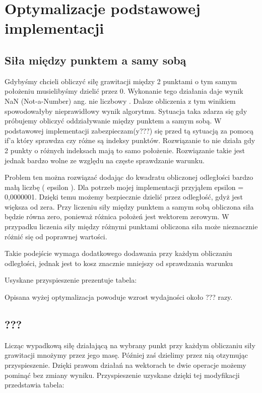 
\section { Optymalizacje podstawowej implementacji }

\subsection { Siła między punktem a samy sobą }
Gdybyśmy chcieli obliczyć siłę grawitacji między 2 punktami o tym samym położeniu musielibyśmy dzielić przez 0. Wykonanie tego działania daje wynik NaN (Not-a-Number) { ang. nie liczbowy }. Dalsze obliczenia z tym winikiem spowodowałyby nieprawidłowy wynik algorytmu. Sytuacja taka zdarza się gdy próbujemy obliczyć oddziaływanie między punktem a samym sobą. W podstawowej implementacji zabezpieczam(y???) się przed tą sytuacją za pomocą if'a który sprawdza czy różne są indeksy punktów. Rozwiązanie to nie działa gdy 2 punkty o różnych indeksach mają to samo położenie.
Rozwiązanie takie jest jednak bardzo wolne ze względu na częste sprawdzanie warunku. \linebreak

Problem ten można rozwiązać dodając do kwadratu obliczonej odległości bardzo małą liczbę ( epsilon ). Dla potrzeb mojej implementacji przyjąłem epsilon = 0,0000001. Dzięki temu możemy bezpiecznie dzielić przez odległość, gdyż jest większa od zera. Przy liczeniu siły między punktem a samym sobą obliczona siła będzie równa zero, ponieważ różnica położeń jest wektorem zerowym. W przypadku liczenia siły między różnymi punktami obliczona siła może nieznacznie różnić się od poprawnej wartości.

Takie podejście wymaga dodatkowego dodawania przy każdym obliczaniu odległości, jednak jest to kosz znacznie mniejszy od sprawdzania warunku

Usyskane przyspieszenie prezentuje tabela:
\linebreak

Opisana wyżej optymalizacja powoduje wzrost wydajności około ??? razy. 


\subsection { ??? }
Licząc wypadkową siłę działającą na wybrany punkt przy każdym obliczaniu siły grawitacji mnożymy przez jego masę. Później zaś dzielimy przez nią otzymując przyspieszenie. Dzięki prawom działań na wektorach te dwie operacje możemy pominąć bez zmiany wyniku. Przyspieszenie uzyskane dzięki tej modyfikacji przedstawia tabela:


